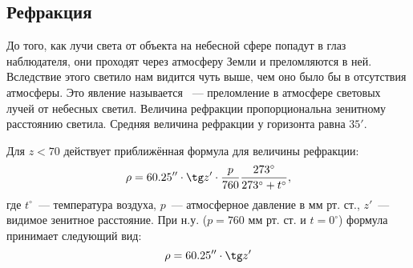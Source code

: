 \subsection{Рефракция}

До того, как лучи света от объекта на небесной сфере попадут в глаз наблюдателя, они проходят через атмосферу Земли и преломляются в ней. Вследствие этого светило нам видится чуть выше, чем оно было бы в отсутствия атмосферы. Это явление называется ~--- преломление в атмосфере световых лучей от небесных светил. Величина рефракции пропорциональна зенитному расстоянию светила. Средняя величина рефракции у горизонта равна $35'$.

Для $z<70$ действует приближённая формула для величины рефракции:
\begin{equation}
\rho=60.25''\cdot\tg z'\cdot \frac{p}{760}\frac{273^{\circ}}{273^{\circ}+t^{\circ}},
\end{equation}
где $t^{\circ}$~--- температура воздуха, $p$~--- атмосферное давление в мм рт. ст., $z'$~--- видимое зенитное расстояние. При н.у. ($p=760$ мм рт. ст. и $t=0^{\circ}$) формула принимает следующий вид:
\begin{equation}
\rho=60.25''\cdot\tg z'
\end{equation}